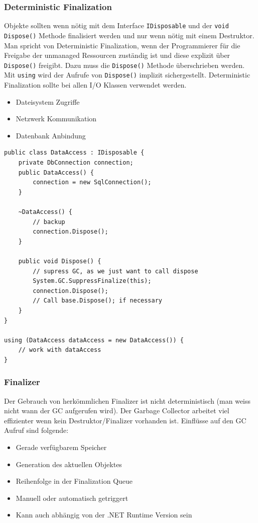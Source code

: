 \subsubsection{Deterministic Finalization} Objekte sollten wenn nötig mit dem Interface \lstinline|IDisposable| und der \lstinline|void Dispose()| Methode finalisiert werden und nur wenn nötig mit einem Destruktor. Man spricht von Deterministic Finalization, wenn der Programmierer für die Freigabe der unmanaged Ressourcen zuständig ist und diese explizit über \lstinline|Dispose()| freigibt. Dazu muss die \lstinline|Dispose()| Methode überschrieben werden. Mit \lstinline|using| wird der Aufrufe von \lstinline|Dispose()| implizit sichergestellt. Deterministic Finalization sollte bei allen I/O Klassen verwendet werden.
\begin{itemize}
	\item Dateisystem Zugriffe
	\item Netzwerk Kommunikation
	\item Datenbank Anbindung
\end{itemize}

\begin{lstlisting}
public class DataAccess : IDisposable {
	private DbConnection connection;
	public DataAccess() { 
		connection = new SqlConnection();
	}
	
	~DataAccess() {
		// backup
		connection.Dispose(); 
	}
	
	public void Dispose() {
		// supress GC, as we just want to call dispose
		System.GC.SuppressFinalize(this);
		connection.Dispose();
		// Call base.Dispose(); if necessary
	}
}

using (DataAccess dataAccess = new DataAccess()) {
	// work with dataAccess
}
\end{lstlisting}

\subsubsection{Finalizer} Der Gebrauch von herkömmlichen Finalizer ist nicht deterministisch (man weiss nicht wann der GC aufgerufen wird). Der Garbage Collector arbeitet viel effizienter wenn kein Destruktor/Finalizer vorhanden ist. Einflüsse auf den GC Aufruf sind folgende:
\begin{itemize}
	\item Gerade verfügbarem Speicher
	\item Generation des aktuellen Objektes
	\item Reihenfolge in der Finalization Queue
	\item Manuell oder automatisch getriggert
	\item Kann auch abhängig von der .NET Runtime Version sein
\end{itemize}

